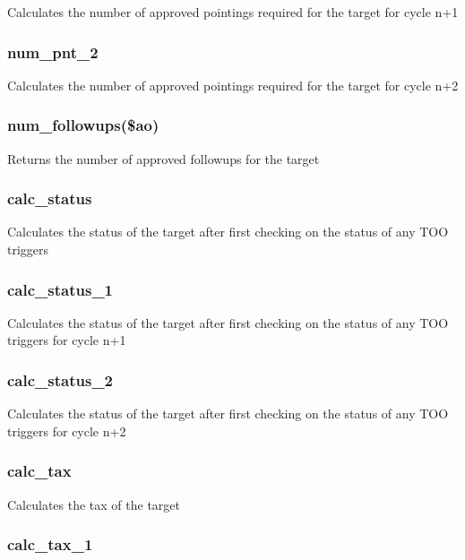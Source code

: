 \documentclass{article}
\begin{document}
Calculates the number of approved pointings required for the target for cycle
n+1

\subsubsection*{num\_pnt\_2\label{Target_num_pnt_2}}


Calculates the number of approved pointings required for the target for cycle
n+2

\subsubsection*{num\_followups(\$ao)\label{Target_num_followups_ao_}}


Returns the number of approved followups for the target

\subsubsection*{calc\_status\label{Target_calc_status}}


Calculates the status of the target after first checking on the status of any
TOO triggers

\subsubsection*{calc\_status\_1\label{Target_calc_status_1}}


Calculates the status of the target after first checking on the status of any
TOO triggers for cycle n+1

\subsubsection*{calc\_status\_2\label{Target_calc_status_2}}


Calculates the status of the target after first checking on the status of any
TOO triggers for cycle n+2

\subsubsection*{calc\_tax\label{Target_calc_tax}}


Calculates the tax of the target

\subsubsection*{calc\_tax\_1\label{Target_calc_tax_1}}
\end{document}
